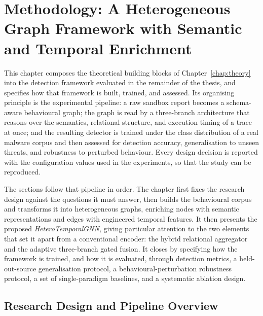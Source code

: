 \documentclass[%
    BCOR=10mm,
    DIV=13,
    toc=bibliography,
    toc=listof,
    oneside,
    12pt,
]{scrbook}
\begin{document}
\chapter{Methodology: A Heterogeneous Graph Framework with Semantic and Temporal Enrichment}
\label{chap:methodology}

This chapter composes the theoretical building blocks of
Chapter~\ref{chap:theory} into the detection framework evaluated in the
remainder of the thesis, and specifies how that framework is built, trained, and
assessed. Its organising principle is the experimental pipeline: a raw sandbox
report becomes a schema-aware behavioural graph; the graph is read by a
three-branch architecture that reasons over the semantics, relational structure,
and execution timing of a trace at once; and the resulting detector is trained
under the class distribution of a real malware corpus and then assessed for
detection accuracy, generalisation to unseen threats, and robustness to
perturbed behaviour. Every design decision is reported with the configuration
values used in the experiments, so that the study can be reproduced.

The sections follow that pipeline in order. The chapter first fixes the research
design against the questions it must answer, then builds the behavioural corpus
and transforms it into heterogeneous graphs, enriching nodes with semantic
representations and edges with engineered temporal features. It then presents the
proposed \emph{HeteroTemporalGNN}, giving particular attention to the two
elements that set it apart from a conventional encoder: the hybrid relational
aggregator and the adaptive three-branch gated fusion. It closes by specifying
how the framework is trained, and how it is evaluated, through detection metrics,
a held-out-source generalisation protocol, a behavioural-perturbation robustness
protocol, a set of single-paradigm baselines, and a systematic ablation design.

\section{Research Design and Pipeline Overview}
\label{sec:research_design}
\end{document}
